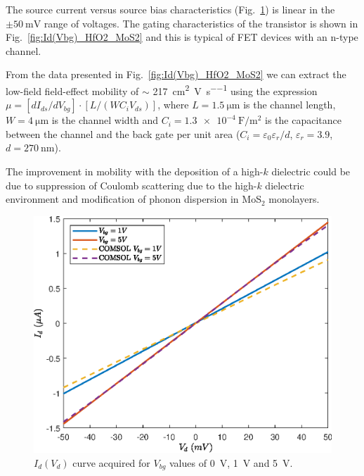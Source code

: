 \documentclass[electronics,article,submit,moreauthors,pdftex]{Definitions/mdpi}
\begin{document}
The source current versus source bias characteristics (Fig.~\ref{fig:Id(Vd)_HfO2_MoS2}) is linear in the $\pm \SI{50} {\milli \volt}$ range of voltages. The gating characteristics of the transistor is shown in Fig.~\ref{fig:Id(Vbg)_HfO2_MoS2} and this is typical of FET devices with an n-type channel.

From the data presented in Fig.~\ref{fig:Id(Vbg)_HfO2_MoS2} we can extract the low-field field-effect mobility of $\sim$ \SI{217}{\square \centi \meter  \per \volt \per \second} using the expression $\mu = [dI_{ds}/dV_{bg}]\cdot[L/(WC_iV_{ds})]$, where $L= \SI{1.5}{\micro \meter}$ is the channel length, $W = \SI{4}{\micro \meter}$ is the channel width and $C_i = \SI{1.3 e-4}{\farad \per \square \meter}$ is the capacitance between the channel and the back gate per unit area ($C_i = \varepsilon_0 \varepsilon_r / d$, $\varepsilon_r = 3.9$, $d = \SI{270}{\nano \meter}$).

The improvement in mobility with the deposition of a high-$k$ dielectric could be due to suppression of Coulomb scattering due to the high-$k$ dielectric environment and modification of phonon dispersion in MoS$_2$ monolayers.

\begin{figure}[H]
	\centering
	\includegraphics[width=.75\textwidth]{Grafici/Id(Vd)_HfO2_MoS2.eps} 
	\caption{$I_d(V_d)$ curve acquired for $V_{bg}$ values of \SI{0}{\volt}, \SI{1}{\volt} and \SI{5}{\volt}.}
	\label{fig:Id(Vd)_HfO2_MoS2}
\end{figure}
\end{document}

